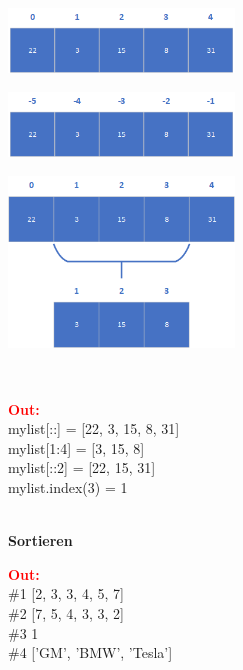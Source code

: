 	\begin{minipage}[h]{6cm}
		\includegraphics[width=6cm,align=t]{pics/Listen/indexing_pos.png}
	\end{minipage}
	\begin{minipage}[h]{6cm}
		\includegraphics[width=6cm,align=t]{pics/Listen/indexing_neg.png}
	\end{minipage}
	\begin{minipage}[h]{6cm}
		\includegraphics[width=6cm,align=t]{pics/Listen/slicing.png}
	\end{minipage}
	\\
	\begin{minipage}[h]{10cm}
		
	\end{minipage}
	\begin{minipage}[h]{8cm}
		\textcolor{red}{\textbf{Out:}}
		\\mylist[::] = [22, 3, 15, 8, 31]
		\\mylist[1:4] = [3, 15, 8]
		\\mylist[::2] = [22, 15, 31]
		\\mylist.index(3) = 1
	\end{minipage}
	\vspace{0.5cm}
	\\\textbf{Sortieren}
	\vspace{0.1cm}
	\\
	\begin{minipage}[h]{10cm}
		
	\end{minipage}
	\begin{minipage}[h]{8cm}
		\textcolor{red}{\textbf{Out:}}
		\\\#1 [2, 3, 3, 4, 5, 7]
		\\\#2 [7, 5, 4, 3, 3, 2]
		\\\#3 1
		\\\#4 ['GM', 'BMW', 'Tesla']
	\end{minipage}
